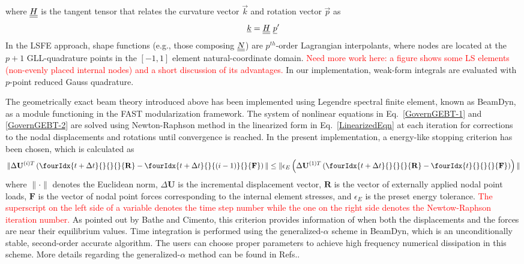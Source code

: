 where $\underline{\underline{H}}$ is the tangent tensor that relates the curvature vector $\vec{k}$ and rotation vector $\vec{p}$ as
\begin{equation}
    \label{Tensor}
    \underline{k} = \underline{\underline{H}}~ \underline{p}^\prime
\end{equation}
In the LSFE approach, shape functions (e.g., those composing $\underline{\underline{N}}$) are
$p^{th}$-order Lagrangian interpolants, where nodes are located at the $p+1$
GLL-quadrature points in the $[-1,1]$ element natural-coordinate domain.
\textcolor{red}{Need more work here: a figure shows some LS elements
(non-evenly placed internal nodes) and a short discussion of its
advantages.} In our implementation, weak-form integrals are evaluated with
$p$-point reduced Gauss quadrature.

The geometrically exact beam theory introduced above has been implemented using Legendre spectral finite element, known as BeamDyn, as a module functioning in the FAST modularization framework. The system of nonlinear equations in Eq.~\eqref{GovernGEBT-1} and \eqref{GovernGEBT-2} are solved using Newton-Raphson method in the linearized form in Eq.~\eqref{LinearizedEqn} at each iteration for corrections to the nodal displacements and rotations until convergence is reached. In the present implementation, a energy-like stopping criterion has been chosen, which is calculated as
\begin{equation}
    \label{StoppingCriterion}
    \| \Delta \mathbf{U}^{(i)T} \left( \fourIdx{t+\Delta t}{}{}{}{\mathbf{R}} -  \fourIdx{t+\Delta t}{}{(i-1)}{}{\mathbf{F}}  \right) \| \leq \| \epsilon_E \left( \Delta \mathbf{U}^{(1)T} \left( \fourIdx{t+\Delta t}{}{}{}{\mathbf{R}} - \fourIdx{t}{}{}{}{\mathbf{F}} \right) \right) \|
\end{equation}
where $\|\cdot\|$ denotes the Euclidean norm, $\Delta \mathbf{U}$ is the
incremental displacement vector, $\mathbf{R}$ is the vector of externally
applied nodal point loads, $\mathbf{F}$ is the vector of nodal point forces
corresponding to the internal element stresses, and $\epsilon_E$ is the
preset energy tolerance. \textcolor{red}{The superscript on the left side of a variable denotes the time step number while the one on the right side denotes the Newtow-Raphson iteration number.} As pointed out by Bathe and
Cimento\cite{Bathe-Cimento:1980}, this criterion provides information of
when both the displacements and the forces are near their equilibrium
values. Time integration is performed using the generalized-$\alpha$ scheme in
BeamDyn, which is an unconditionally stable, second-order accurate algorithm.
The users can choose proper parameters to achieve high frequency numerical
dissipation in this scheme. More details regarding the generalized-$\alpha$
method can be found in Refs.\cite{Chung-Hulbert:1993,Bauchau:2010}. 


